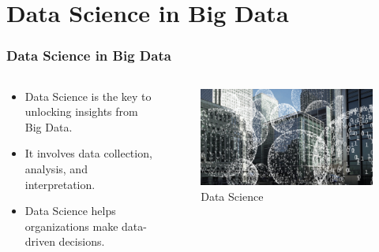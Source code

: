\documentclass{beamer}
\begin{document}
\section{Data Science in Big Data}
	\begin{frame}
	\frametitle{Data Science in Big Data}
		\begin{columns}
			\begin{column}{0.5\textwidth}
				\begin{itemize}
  					\item Data Science is the key to unlocking insights from Big Data.
  					\item It involves data collection, analysis, and interpretation.
  					\item Data Science helps organizations make data-driven decisions.
				\end{itemize}
			\end{column}
			\begin{column}{0.5\textwidth}
				\begin{figure}
        		\includegraphics[width=\linewidth]{resources/bigdata2.png} %
        		\caption{Data Science}
      			\end{figure}
			\end{column}
		\end{columns}
	\end{frame}

\end{document}
